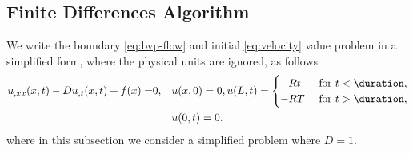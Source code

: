 \documentclass[twoside,a4paper,12pt,draft]{article}
\begin{document}
\subsection{Finite Differences Algorithm}

We write the boundary \eqref{eq:bvp-flow} and initial
\eqref{eq:velocity} value problem in a simplified form, where the
physical units are ignored, as follows
%
\begin{align}
  \label{eq:heat}
  u_{,xx}(x,t) - D u_{,t}(x,t) + f(x) 
  =& 0 ,        &&u(x,0) = 0, u(L,t) =
            \begin{cases}
              -Rt &\text{ for } t < \duration,\\
              -RT &\text{ for } t > \duration,
            \end{cases}\\\nonumber
 &&& u(0,t) = 0.
\end{align}
%
where in this subsection we consider a simplified problem where $D=1$.
\end{document}
